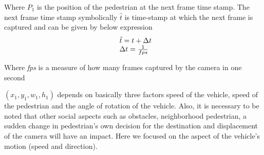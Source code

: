 Where ${P}_1$ is the position of the pedestrian at the next frame time stamp.
The next frame time stamp symbolically $\hat{t}$ is time-stamp at which the next frame is captured and can be given by below expression
\begin{equation} \label{delta-t}
\begin{array}{l@{}}
\hat{t} = t +  \Delta t \\
\Delta t = \frac{1}{fps}
\end{array}
\end{equation}


Where \textit{fps} is a measure of how many frames captured by the camera in one second

$(x_1,y_1,w_1,h_1)$ depends on basically three factors speed of the vehicle, speed of the pedestrian and the angle of rotation of the vehicle. Also, it is necessary to be noted that other social aspects such as obstacles, neighborhood pedestrian, a sudden change in pedestrian's own decision for the destination and displacement of the camera will have an impact.
Here we focused on the aspect of the vehicle's motion (speed and direction).










